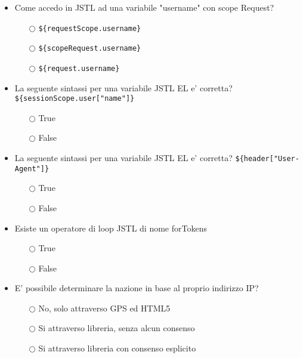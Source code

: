 \documentclass[10pt,twocolumn]{article}
\begin{document}
\begin{itemize}
    \item Come accedo in JSTL ad una variabile "username" con scope Request?
          \begin{itemize}
              \item[$\bigcirc$] \verb=${requestScope.username}=
              \item[$\bigcirc$] \verb=${scopeRequest.username}=
              \item[$\bigcirc$] \verb=${request.username}=
          \end{itemize}
\end{itemize}
\begin{itemize}
    \item La seguente sintassi per una variabile JSTL EL e' corretta? \verb=${sessionScope.user["name"]}=
          \begin{itemize}
              \item[$\bigcirc$] True
              \item[$\bigcirc$] False
          \end{itemize}
\end{itemize}
\begin{itemize}
    \item La seguente sintassi per una variabile JSTL EL e' corretta? \verb=${header["User-Agent"]}=
          \begin{itemize}
              \item[$\bigcirc$] True
              \item[$\bigcirc$] False
          \end{itemize}
\end{itemize}
\begin{itemize}
    \item Esiste un operatore di loop JSTL di nome forTokens
          \begin{itemize}
              \item[$\bigcirc$] True
              \item[$\bigcirc$] False
          \end{itemize}
\end{itemize}
\begin{itemize}
    \item E' possibile determinare la nazione in base al proprio indirizzo IP?
          \begin{itemize}
              \item[$\bigcirc$] No, solo attraverso GPS ed HTML5
              \item[$\bigcirc$] Si attraverso libreria, senza alcun consenso
              \item[$\bigcirc$] Si attraverso libreria con consenso esplicito
          \end{itemize}
\end{itemize}
\end{document}
